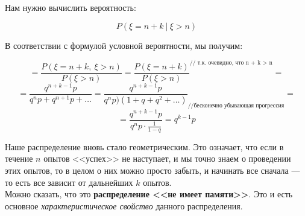 \documentclass{article}
\begin{document}
Нам нужно вычислить вероятность:

$$P(\xi = n + k \ |\ \xi > n)$$

В соответствии с формулой условной вероятности, мы получим:

$$ = \frac{P(\xi = n + k,\ \xi > n)}{P(\xi > n)} =
\frac{P(\xi = n + k) }{P(\xi > n)}^\text{// т.к. очевидно, что n + k > n} =$$
$$ = \frac{q^{n + k - 1} p}{q^n p + q^{n + 1}p + \ldots} =
\frac{q^{n + k - 1}p}{q^np)(1 + q + q^2 + \ldots)}_{\text{//бесконечно убывающая прогрессия}} = $$
$$= \frac{q^{n + k - 1}p}{q^np \cdot \frac{1}{1 - q}} = \boxed{q^{k - 1}p}$$

Наше распределение вновь стало геометрическим. Это означает, что если в течение $n$ опытов <<успех>> не наступает, и мы точно знаем о проведении этих опытов, то в целом о них можно просто забыть, и начинать все сначала --- то есть все зависит от дальнейших $k$ опытов.
\\

Можно сказать, что это \textbf{распределение <<не имеет памяти>>}. Это и есть основное \textit{характеристическое свойство} данного распределения.
\end{document}
